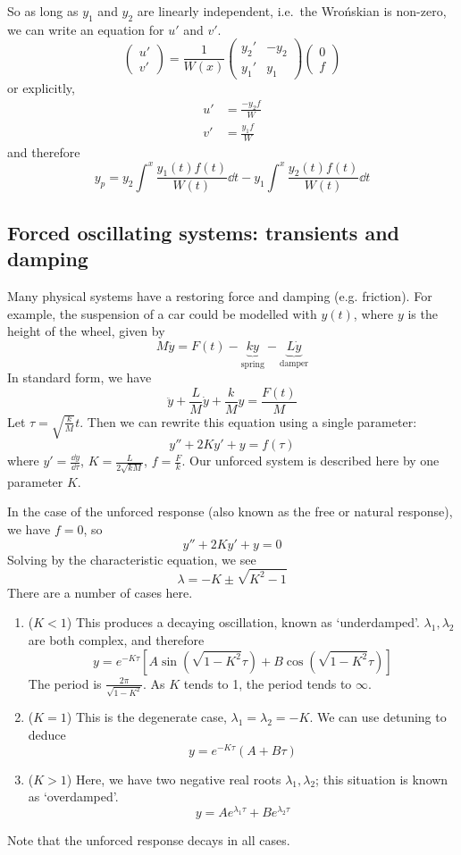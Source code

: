 So as long as \(y_1\) and \(y_2\) are linearly independent, i.e.\ the Wro\'nskian is non-zero, we can write an equation for \(u'\) and \(v'\).
\[
	\begin{pmatrix}
		u' \\ v'
	\end{pmatrix} = \frac{1}{W(x)}\begin{pmatrix}
		y_2' & -y_2 \\ y_1' & y_1
	\end{pmatrix} \begin{pmatrix}
		0 \\ f
	\end{pmatrix}
\]
or explicitly,
\begin{align*}
	u' & = \frac{-y_2 f}{W} \\
	v' & = \frac{y_1 f}{W}
\end{align*}
and therefore
\[
	y_p = y_2 \int^x \frac{y_1(t) f(t)}{W(t)}\dd{t} - y_1 \int^x \frac{y_2(t) f(t)}{W(t)}\dd{t}
\]

\subsection{Forced oscillating systems: transients and damping}
Many physical systems have a restoring force and damping (e.g.
friction).
For example, the suspension of a car could be modelled with \(y(t)\), where \(y\) is the height of the wheel, given by
\[
	M\ddot y = F(t) - \underbrace{ky}_{\text{spring}} - \underbrace{L\dot y}_{\text{damper}}
\]
In standard form, we have
\[
	\ddot y + \frac{L}{M} \dot y + \frac{k}{M} y = \frac{F(t)}{M}
\]
Let \(\tau = \sqrt{\frac{k}{M}} t\).
Then we can rewrite this equation using a single parameter:
\[
	y'' + 2Ky' + y = f(\tau)
\]
where \(y' = \frac{\dd{y}}{\dd \tau}\), \(K = \frac{L}{2\sqrt{kM}}\), \(f = \frac{F}{k}\).
Our unforced system is described here by one parameter \(K\).

In the case of the unforced response (also known as the free or natural response), we have \(f=0\), so
\[
	y'' + 2Ky' + y = 0
\]
Solving by the characteristic equation, we see
\[
	\lambda = -K \pm \sqrt{K^2 - 1}
\]
There are a number of cases here.
\begin{enumerate}
	\item (\(K < 1\)) This produces a decaying oscillation, known as `underdamped'.
	      \(\lambda_1, \lambda_2\) are both complex, and therefore
	      \[
		      y = e^{-K\tau}\left[A\sin(\sqrt{1-K^2}\tau) + B\cos(\sqrt{1-K^2}\tau)\right]
	      \]
	      The period is \(\frac{2\pi}{\sqrt{1-K^2}}\).
	      As \(K\) tends to 1, the period tends to \(\infty\).
	\item (\(K = 1\)) This is the degenerate case, \(\lambda_1 = \lambda_2 = -K\).
	      We can use detuning to deduce
	      \[
		      y = e^{-K\tau} (A + B\tau)
	      \]
	\item (\(K > 1\)) Here, we have two negative real roots \(\lambda_1, \lambda_2\); this situation is known as `overdamped'.
	      \[
		      y = Ae^{\lambda_1 \tau} + Be^{\lambda_2 \tau}
	      \]
\end{enumerate}
Note that the unforced response decays in all cases.

